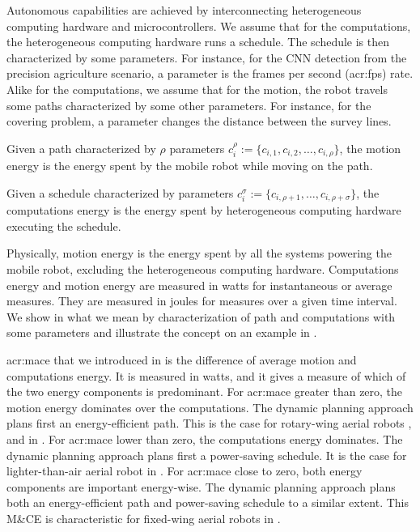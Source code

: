 Autonomous capabilities are achieved by interconnecting heterogeneous computing hardware and microcontrollers. We assume that for the computations, the heterogeneous computing hardware runs a schedule. The schedule is then characterized by some parameters. For instance, for the CNN detection from the precision agriculture scenario, a parameter is the frames per second (\Gls{acr:fps}) rate. Alike for the computations, we assume that for the motion, the robot travels some paths characterized by some other parameters. For instance, for the covering problem, a parameter changes the distance between the survey lines.

\begin{highlight}
\begin{defn}\label{def:comp-mot-energy}
  Given a path characterized by $\rho$ parameters $c_i^\rho:=\{c_{i,1},c_{i,2},\dots,c_{i,\rho}\}$, the motion energy is the energy spent by the mobile robot while moving on the path.

  Given a schedule characterized by parameters $c_i^\sigma:=\{c_{i,\rho+1},\dots,c_{i,\rho+\sigma}\}$, the computations energy is the energy spent by heterogeneous computing hardware executing the schedule.
\end{defn}
\end{highlight}

Physically, motion energy is the energy spent by all the systems powering the mobile robot, excluding the heterogeneous computing hardware. Computations energy and motion energy are measured in watts for instantaneous or average measures. They are measured in joules for measures over a given time interval. We show in  what we mean by characterization of path and computations with some parameters and illustrate the concept on an example in . 

\Gls{acr:mace} that we introduced in  is the difference of average motion and computations energy. It is measured in watts, and it gives a measure of which of the two energy components is predominant. For \Gls{acr:mace} greater than zero, the motion energy dominates over the computations. The dynamic planning approach plans first an energy-efficient path. This is the case for rotary-wing aerial robots , and  in . For \Gls{acr:mace} lower than zero, the computations energy dominates. The dynamic planning approach plans first a power-saving schedule. It is the case for lighter-than-air aerial robot  in . For \Gls{acr:mace} close to zero, both energy components are important energy-wise. The dynamic planning approach plans both an energy-efficient path and power-saving schedule to a similar extent. This M\&CE is characteristic for fixed-wing aerial robots  in .


